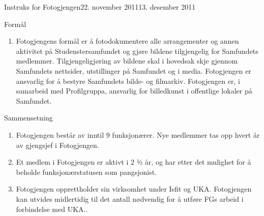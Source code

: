 \begin{instruks*}{Instruks for Fotogjengen}{22. november 2011}{13. desember 2011}

    \begin{instruksledd}{Formål}
        \begin{enumerate}
            \item Fotogjengens formål er å fotodokumentere alle arrangementer og annen aktivitet på Studenstersamfundet og gjøre bildene tilgjengelig for Samfundets medlemmer.  Tilgjengeligjøring av bildene skal i hovedsak skje gjennom Samfundets nettsider, utstillinger på Samfundet og i media. Fotogjengen er ansvarlig for å bestyre Samfundets bilde- og filmarkiv. Fotogjengen er, i samarbeid med Profilgruppa, ansvarlig for billedkunst i offentlige lokaler på Samfundet. 
        \end{enumerate}
    \end{instruksledd}
    
    \begin{instruksledd}{Sammensetning}
        \begin{enumerate} 
            \item Fotogjengen består av inntil 9 funksjonærer. Nye medlemmer tas opp hvert år av
                gjengsjef i Fotogjengen.
            \item Et medlem i Fotogjengen er aktivt i 2 ½ år, og har etter det mulighet for å beholde
                funksjonærstatusen som pangsjonist.
            \item Fotogjengen opprettholder sin virksomhet under Isfit og UKA. Fotogjengen kan utvides
                midlertidig til det antall nødvendig for å utføre FGs arbeid i forbindelse med UKA..
        \end{enumerate}
    \end{instruksledd}


\end{instruks*}

